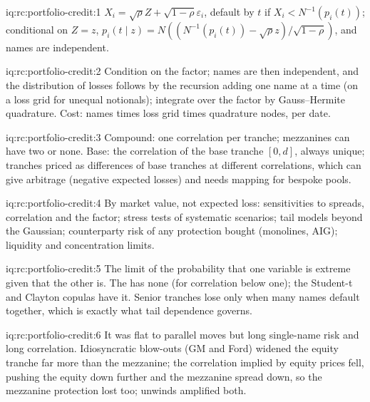 \begin{solution}{iq:rc:portfolio-credit:1}
$X_i = \sqrt\rho Z+\sqrt{1-\rho}\varepsilon_i$, default by $t$ if $X_i < N^{-1}(p_i(t))$;
conditional on $Z = z$, $p_i(t\mid z) = N((N^{-1}(p_i(t))-\sqrt\rho z)/\sqrt{1-\rho})$, and
names are independent.
\end{solution}

\begin{solution}{iq:rc:portfolio-credit:2}
Condition on the factor; names are then independent, and the distribution of losses
follows by the recursion adding one name at a time (on a loss grid for unequal notionals);
integrate over the factor by Gauss--Hermite quadrature. Cost: names times loss grid times
quadrature nodes, per date.
\end{solution}

\begin{solution}{iq:rc:portfolio-credit:3}
Compound: one correlation per tranche; mezzanines can have two or none. Base: the
correlation of the base tranche $[0,d]$, always unique; tranches priced as differences of
base tranches at different correlations, which can give arbitrage (negative expected
losses) and needs mapping for bespoke pools.
\end{solution}

\begin{solution}{iq:rc:portfolio-credit:4}
By market value, not expected loss: sensitivities to spreads, correlation and the factor;
stress tests of systematic scenarios; tail models beyond the Gaussian; counterparty risk
of any protection bought (monolines, AIG); liquidity and concentration limits.
\end{solution}

\begin{solution}{iq:rc:portfolio-credit:5}
The limit of the probability that one variable is extreme given that the other is. The
 has none (for correlation below one); the Student-t and Clayton copulas
have it. Senior tranches lose only when many names default together, which is exactly
what tail dependence governs.
\end{solution}

\begin{solution}{iq:rc:portfolio-credit:6}
It was flat to parallel moves but long single-name risk and long correlation. Idiosyncratic
blow-outs (GM and Ford) widened the equity tranche far more than the mezzanine; the
correlation implied by equity prices fell, pushing the equity down further and the
mezzanine spread down, so the mezzanine protection lost too; unwinds amplified both.
\end{solution}
